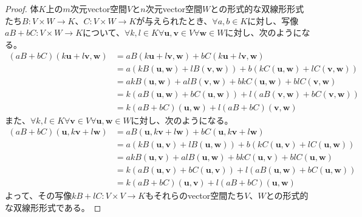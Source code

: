 \documentclass[dvipdfmx]{jsarticle}
\begin{document}
\begin{proof}
体$K$上の$m$次元vector空間$V$と$n$次元vector空間$W$との形式的な双線形形式たち$B:V \times W \rightarrow K$、$C:V \times W \rightarrow K$が与えられたとき、$\forall a,b \in K$に対し、写像$aB + bC:V \times W \rightarrow K$について、$\forall k,l \in K\forall\mathbf{u},\mathbf{v} \in V\forall\mathbf{w} \in W$に対し、次のようになる。
\begin{align*}
(aB + bC)\left( k\mathbf{u} + l\mathbf{v},\mathbf{w} \right) &= aB\left( k\mathbf{u} + l\mathbf{v},\mathbf{w} \right) + bC\left( k\mathbf{u} + l\mathbf{v},\mathbf{w} \right)\\
&= a\left( kB\left( \mathbf{u},\mathbf{w} \right) + lB\left( \mathbf{v},\mathbf{w} \right) \right) + b\left( kC\left( \mathbf{u},\mathbf{w} \right) + lC\left( \mathbf{v},\mathbf{w} \right) \right)\\
&= akB\left( \mathbf{u},\mathbf{w} \right) + alB\left( \mathbf{v},\mathbf{w} \right) + bkC\left( \mathbf{u},\mathbf{w} \right) + blC\left( \mathbf{v},\mathbf{w} \right)\\
&= k\left( aB\left( \mathbf{u},\mathbf{w} \right) + bC\left( \mathbf{u},\mathbf{w} \right) \right) + l\left( aB\left( \mathbf{v},\mathbf{w} \right) + bC\left( \mathbf{v},\mathbf{w} \right) \right)\\
&= k(aB + bC)\left( \mathbf{u},\mathbf{w} \right) + l(aB + bC)\left( \mathbf{v},\mathbf{w} \right)
\end{align*}
また、$\forall k,l \in K\forall\mathbf{v} \in V\forall\mathbf{u},\mathbf{w} \in W$に対し、次のようになる。
\begin{align*}
(aB + bC)\left( \mathbf{u},k\mathbf{v} + l\mathbf{w} \right) &= aB\left( \mathbf{u},k\mathbf{v} + l\mathbf{w} \right) + bC\left( \mathbf{u},k\mathbf{v} + l\mathbf{w} \right)\\
&= a\left( kB\left( \mathbf{u},\mathbf{v} \right) + lB\left( \mathbf{u},\mathbf{w} \right) \right) + b\left( kC\left( \mathbf{u},\mathbf{v} \right) + lC\left( \mathbf{u},\mathbf{w} \right) \right)\\
&= akB\left( \mathbf{u},\mathbf{v} \right) + alB\left( \mathbf{u},\mathbf{w} \right) + bkC\left( \mathbf{u},\mathbf{v} \right) + blC\left( \mathbf{u},\mathbf{w} \right)\\
&= k\left( aB\left( \mathbf{u},\mathbf{v} \right) + bC\left( \mathbf{u},\mathbf{v} \right) \right) + l\left( aB\left( \mathbf{u},\mathbf{w} \right) + bC\left( \mathbf{u},\mathbf{w} \right) \right)\\
&= k(aB + bC)\left( \mathbf{u},\mathbf{v} \right) + l(aB + bC)\left( \mathbf{u},\mathbf{w} \right)
\end{align*}
よって、その写像$kB + lC:V \times V \rightarrow K$もそれらのvector空間たち$V$、$W$との形式的な双線形形式である。
\end{proof}
\end{document}
